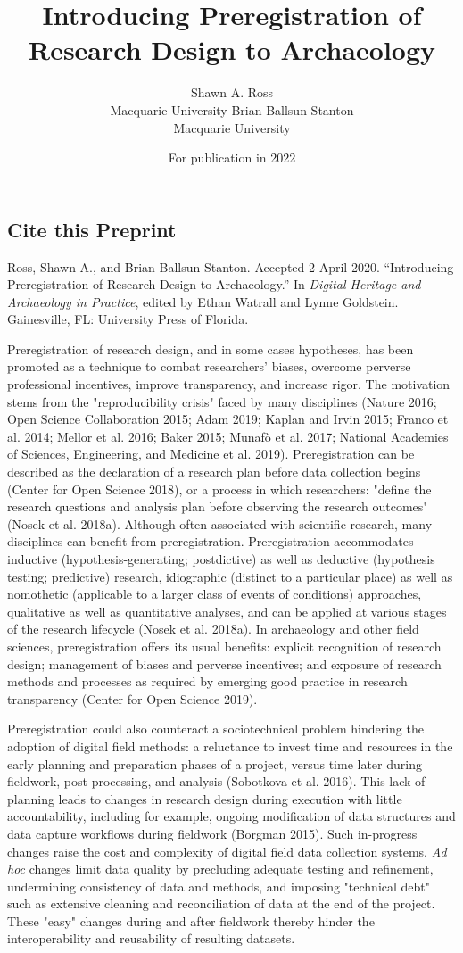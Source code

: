 \documentclass[article]{sa}
\title{Introducing Preregistration of Research Design to Archaeology}
\author{Shawn A. Ross\\Macquarie University \And Brian Ballsun-Stanton\\Macquarie University}
\date{For publication in 2022}
\begin{document}
\subsection*{Cite this Preprint}

{\small
\hangindent=0.5cm{}Ross, Shawn A., and Brian Ballsun-Stanton. Accepted 2 April 2020. ``Introducing Preregistration of Research Design to Archaeology.'' In \textit{Digital Heritage and Archaeology in Practice}, edited by Ethan Watrall and Lynne Goldstein. Gainesville, FL: University Press of Florida.

 }


\newpage

Preregistration of research design, and in some cases hypotheses, has
been promoted as a technique to combat researchers' biases, overcome
perverse professional incentives, improve transparency, and increase
rigor. The motivation stems from the "reproducibility crisis" faced by
many disciplines (Nature 2016; Open Science Collaboration 2015; Adam
2019; Kaplan and Irvin 2015; Franco et al. 2014; Mellor et al. 2016;
Baker 2015; Munafò et al. 2017; National Academies of Sciences,
Engineering, and Medicine et al. 2019). Preregistration can be described
as the declaration of a research plan before data collection begins
(Center for Open Science 2018), or a process in which researchers:
"define the research questions and analysis plan before observing the
research outcomes" (Nosek et al. 2018a). Although often associated with
scientific research, many disciplines can benefit from preregistration.
Preregistration accommodates inductive (hypothesis-generating;
postdictive) as well as deductive (hypothesis testing; predictive)
research, idiographic (distinct to a particular place) as well as
nomothetic (applicable to a larger class of events of conditions)
approaches, qualitative as well as quantitative analyses, and can be
applied at various stages of the research lifecycle (Nosek et al.
2018a). In archaeology and other field sciences, preregistration offers
its usual benefits: explicit recognition of research design; management
of biases and perverse incentives; and exposure of research methods and
processes as required by emerging good practice in research transparency
(Center for Open Science 2019).

Preregistration could also counteract a sociotechnical problem hindering
the adoption of digital field methods: a reluctance to invest time and
resources in the early planning and preparation phases of a project,
versus time later during fieldwork, post-processing, and analysis
(Sobotkova et al. 2016). This lack of planning leads to changes in
research design during execution with little accountability, including
for example, ongoing modification of data structures and data capture
workflows during fieldwork (Borgman 2015). Such in-progress changes
raise the cost and complexity of digital field data collection systems.
\emph{Ad hoc} changes limit data quality by precluding adequate testing
and refinement, undermining consistency of data and methods, and
imposing "technical debt" such as extensive cleaning and reconciliation
of data at the end of the project. These "easy" changes during and after
fieldwork thereby hinder the interoperability and reusability of
resulting datasets.
\end{document}

